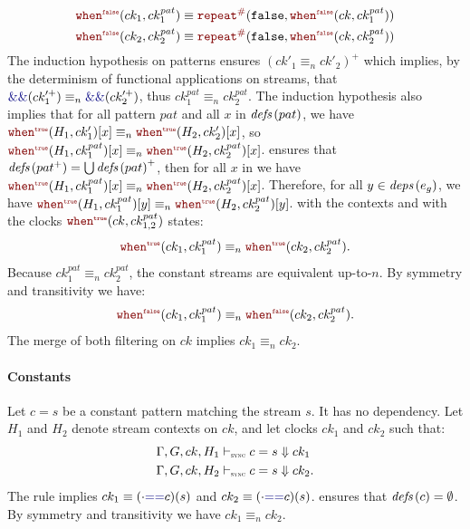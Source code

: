 \begin{skippableproof}
\begin{align*}
         & \whenF{ck_1}{ck^{pat}_1} \equiv \const{\false}{\whenF{ck}{ck^{pat}_1}}                     \\
         & \whenF{ck_2}{ck^{pat}_2} \equiv \const{\false}{\whenF{ck}{ck^{pat}_2}}
    \end{align*}
    The induction hypothesis on patterns ensures $(ck'_1 \equiv_n ck'_2)^+$ which implies, by the
    determinism of functional applications on streams, that $\kwf{\&\&}(ck^{\prime+}_1) \equiv_n
        \kwf{\&\&}(ck^{\prime+}_2)$, thus $ck^{pat}_1 \equiv_n ck^{pat}_2$. The induction hypothesis
    also implies that for all pattern $pat$ and all $x$ in $\defs{pat}$, we have $\whenT{H_1}{ck'_1}
        [x] \equiv_n \whenT{H_2}{ck'_2}[x]$, so $\whenT{H_1}{ck^{pat}_1}[x]
        \equiv_n \whenT{H_2}{ck^{pat}_2}[x]$.
     ensures that $\defs{pat^+} = \bigcup
        \defs{pat}^+$, then for all $x$ in  we have $\whenT{H_1}{ck^{pat}_1}[x]
        \equiv_n \whenT{H_2}{ck^{pat}_2}[x]$. Therefore, for all $y \in \deps{e_g}$, we have
    $\whenT{H_1}{ck^{pat}_1}[y] \equiv_n \whenT{H_2}{ck^{pat}_2}[y]$.
     with the contexts  and
    with the clocks $\whenT{ck}{ck^{pat}_{1,2}}$ states:
    \begin{equation*}
        \whenT{ck_1}{ck^{pat}_1} \equiv_n \whenT{ck_2}{ck^{pat}_2}.
    \end{equation*}
    Because $ck^{pat}_1 \equiv_n ck^{pat}_2$, the constant streams  are equivalent up-to-$n$. By symmetry and transitivity
    we have: $$\whenF{ck_1}{ck^{pat}_1} \equiv_n \whenF{ck_2}{ck^{pat}_2}.$$
    The merge of both filtering on $ck$ implies $ck_1 \equiv_n ck_2$.

    \paragraph{Constants}

    Let $c = s$ be a constant pattern matching the stream $s$. It has no dependency.
    Let $H_1$ and $H_2$ denote stream contexts on $ck$, and let clocks $ck_1$ and $ck_2$ such that:
    \begin{align*}
         & \patDenot{H_1}{ck}{c = s}{ck_1}  \\
         & \patDenot{H_2}{ck}{c = s}{ck_2}.
    \end{align*}
    The rule  implies $ck_1 \equiv
        (\cdot \kwf{==} c)(s)$ and $ck_2 \equiv (\cdot \kwf{==} c)(s)$.  ensures that $\defs{c} = \emptyset$. By symmetry and transitivity
    we have $ck_1 \equiv_n ck_2$.


\end{skippableproof}
